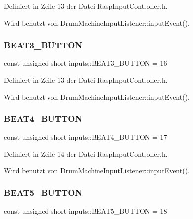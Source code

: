 Definiert in Zeile 13 der Datei Rasp\+Input\+Controller.\+h.



Wird benutzt von Drum\+Machine\+Input\+Listener\+::input\+Event().

\mbox{\label{namespaceinputs_ab60a6fc2188a034f76d3fbe554efe314}} 
\subsubsection{\texorpdfstring{B\+E\+A\+T3\+\_\+\+B\+U\+T\+T\+ON}{BEAT3\_BUTTON}}
{\footnotesize\ttfamily const unsigned short inputs\+::\+B\+E\+A\+T3\+\_\+\+B\+U\+T\+T\+ON = 16}



Definiert in Zeile 13 der Datei Rasp\+Input\+Controller.\+h.



Wird benutzt von Drum\+Machine\+Input\+Listener\+::input\+Event().

\mbox{\label{namespaceinputs_af65f26f63a9572003a2bc49e7955e319}} 
\subsubsection{\texorpdfstring{B\+E\+A\+T4\+\_\+\+B\+U\+T\+T\+ON}{BEAT4\_BUTTON}}
{\footnotesize\ttfamily const unsigned short inputs\+::\+B\+E\+A\+T4\+\_\+\+B\+U\+T\+T\+ON = 17}



Definiert in Zeile 14 der Datei Rasp\+Input\+Controller.\+h.



Wird benutzt von Drum\+Machine\+Input\+Listener\+::input\+Event().

\mbox{\label{namespaceinputs_a8a027829529daa53a24ece7b8334164b}} 
\subsubsection{\texorpdfstring{B\+E\+A\+T5\+\_\+\+B\+U\+T\+T\+ON}{BEAT5\_BUTTON}}
{\footnotesize\ttfamily const unsigned short inputs\+::\+B\+E\+A\+T5\+\_\+\+B\+U\+T\+T\+ON = 18}



